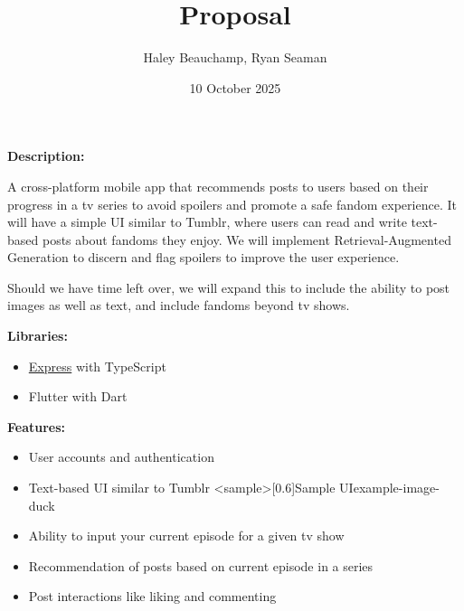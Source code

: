 \documentclass{homework}
\author{Haley Beauchamp, Ryan Seaman}
\date{10 October 2025}
\title{Proposal}
\begin{document}
 \maketitle

\textbf{Description:} 

A cross-platform mobile app that recommends posts to users based on their progress in a tv series to avoid spoilers and promote a safe fandom experience. It will have a simple UI similar to Tumblr, where users can read and write text-based posts about fandoms they enjoy. We will implement Retrieval-Augmented Generation to discern and flag spoilers to improve the user experience. 

Should we have time left over, we will expand this to include the ability to post images as well as text, and include fandoms beyond tv shows.

\bigskip

\textbf{Libraries:}
\begin{itemize}
  \item \href{https://expressjs.com/}{Express}  with TypeScript
  \item Flutter with Dart
\end{itemize}

\bigskip

\textbf{Features:}
\begin{itemize}
  \item User accounts and authentication
  \item Text-based UI similar to Tumblr
  \img<sample>[0.6]{Sample UI}{example-image-duck}
  \item Ability to input your current episode for a given tv show
  \item Recommendation of posts based on current episode in a series
  \item Post interactions like liking and commenting
\end{itemize}

% 
% 
\end{document}
